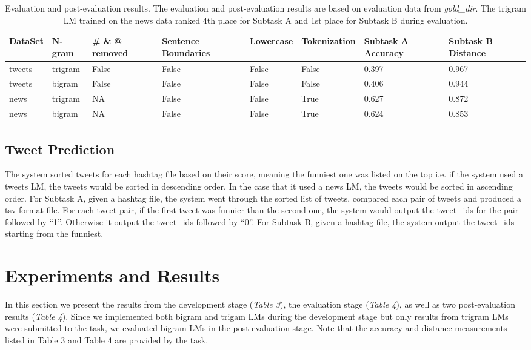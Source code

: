 \documentclass[11pt,a4paper]{article}
\begin{document}
\begin{table*}[h!]
\centering
\begin{tabular}{ |p{1.2cm}|p{1.2cm}|p{1.2cm}|p{1.7cm}|p{1.5cm}|p{1.9cm}|p{1.7cm}|p{1.7cm}|}
\hline
DataSet & N-gram & \# \& @ removed  & Sentence Boundaries & Lowercase & Tokenization & Subtask A Accuracy & Subtask B Distance \\
\hline
tweets & trigram & False & False & False & False & 0.397 & 0.967 \\
\hline
tweets & bigram & False & False & False & False & 0.406 & 0.944 \\
\hline
news & trigram & NA & False & False & True & 0.627 & 0.872 \\
\hline
news & bigram & NA & False & False & True & 0.624 & 0.853 \\
\hline
\end{tabular}
\caption{Evaluation and post-evaluation results. The evaluation and post-evaluation results are based on evaluation data from \textit{gold\_dir}. The trigram LM trained on the news data ranked 4th place for Subtask A and 1st place for Subtask B during evaluation.}
\label{table:4}
\end{table*}

\subsection{Tweet Prediction}
The system sorted tweets for each hashtag file based on their score, meaning the funniest one was listed on the top i.e. if the system used a tweets LM, the tweets would be sorted in descending order. In the case that it used a news LM, the tweets would be sorted in ascending order. For Subtask A, given a hashtag file, the system went through the sorted list of tweets, compared each pair of tweets and produced a tsv format file. For each tweet pair, if the first tweet was funnier than the second one, the system would output the tweet\_ids for the pair followed by ``1''. Otherwise it output the tweet\_ids followed by ``0''. For Subtask B, given a hashtag file, the system output the tweet\_ids starting from the funniest.


\section{Experiments and Results}
In this section we present the results from the development stage (\textit{Table 3}), the evaluation stage (\textit{Table 4}), as well as two post-evaluation results (\textit{Table 4}). Since we implemented both bigram and trigam LMs during the development stage but only results from trigram LMs were submitted to the task, we evaluated bigram LMs in the post-evaluation stage. Note that the accuracy and distance measurements listed in Table 3 and Table 4 are provided by the task. 
\end{document}
